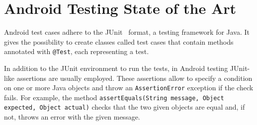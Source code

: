 \documentclass[11pt,a4paper,notitlepage]{article}
\begin{document}


\newpage
\part{Android Testing State of the Art}\label{part_state_art}

Android test cases adhere to the JUnit~\cite{JUnit} format, a testing framework for Java. It gives the possibility to create classes called test cases that contain methods annotated with \texttt{@Test}, each representing a test.

In addition to the JUnit environment to run the tests, in Android testing JUnit-like assertions are usually employed. These assertions allow to specify a condition on one or more Java objects and throw an \texttt{AssertionError} exception if the check fails. For example, the method \texttt{assertEquals(String message, Object expected, Object actual)} checks that the two given objects are equal and, if not, throws an error with the given message.
\end{document}
